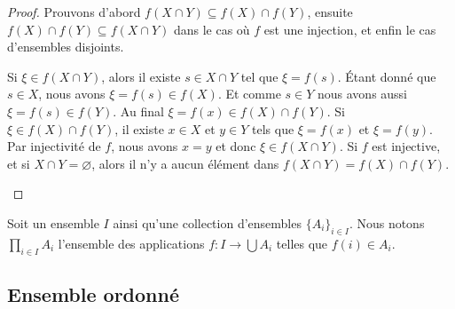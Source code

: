 \begin{proof}
	Prouvons d'abord \( f(X\cap Y) \subseteq f(X)\cap f(Y)\), ensuite \( f(X)\cap f(Y)\subseteq f(X\cap Y)\) dans le cas où \( f \) est une injection, et enfin le cas d'ensembles disjoints.
	\begin{subproof}
		Si \( \xi\in f(X\cap Y)\), alors il existe \( s\in X\cap Y\) tel que \( \xi=f(s)\). Étant donné que \( s\in X\), nous avons \( \xi=f(s)\in f(X)\). Et comme \( s\in Y\) nous avons aussi \( \xi=f(s)\in f(Y)\). Au final \( \xi=f(x)\in f(X)\cap f(Y)\).
		Si \( \xi\in f(X)\cap f(Y)\), il existe \( x\in X\) et \( y\in Y\) tels que \( \xi=f(x)\) et \( \xi=f(y)\). Par injectivité de \( f\), nous avons \( x=y\) et donc \( \xi\in f(X\cap Y)\).
		Si \( f \) est injective, et si \( X\cap Y = \varnothing \), alors il n'y a aucun élément dans \( f(X\cap Y)=f(X)\cap f(Y) \).
	\end{subproof}
\end{proof}

\begin{definition}	\label{DEFooTYIMooZUsYJw}
	Soit un ensemble \( I\) ainsi qu'une collection d'ensembles \( \{ A_i \}_{i\in I}\). Nous notons \( \prod_{i\in I}A_i\) l'ensemble des applications \(f \colon I\to \bigcup A_i  \) telles que \( f(i)\in A_i\).
\end{definition}

\subsection{Ensemble ordonné}
\label{SUBooEnsembleOrdonne}


